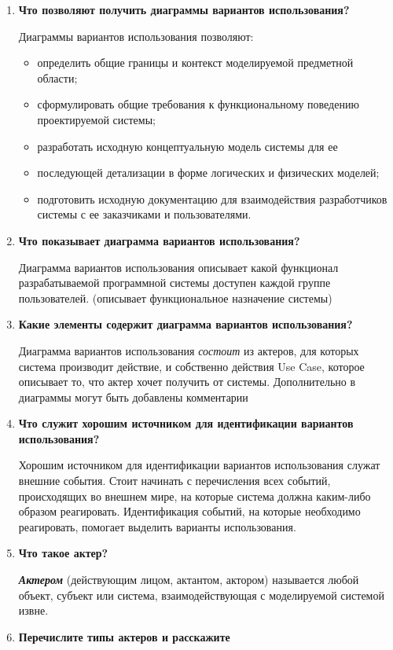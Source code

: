 \begin{enumerate}
	\item \textbf{Что позволяют получить диаграммы
		вариантов использования?}\par
		Диаграммы вариантов использования позволяют:
		\begin{itemize}
			\item определить общие границы и контекст моделируемой
				предметной области;
			\item сформулировать общие требования к функциональному поведению
				проектируемой системы;
			\item разработать исходную концептуальную модель системы для ее
			\item последующей детализации в форме логических
				и физических моделей;
			\item подготовить исходную документацию для взаимодействия
				разработчиков системы с ее заказчиками и пользователями.
		\end{itemize}
	\item \textbf{Что показывает диаграмма вариантов использования?}\par
		Диаграмма вариантов использования описывает какой функционал
		разрабатываемой программной системы доступен каждой группе
		пользователей. (описывает функциональное назначение системы)
	\item \textbf{Какие элементы содержит диаграмма
		вариантов использования?}\par
		Диаграмма вариантов использования \textit{состоит} из актеров,
		для которых система производит действие, и собственно действия
		Use Case, которое описывает то, что актер хочет получить от системы.
		Дополнительно в диаграммы могут быть добавлены комментарии
	\item \textbf{Что служит хорошим источником для идентификации
		вариантов использования?}\par
		Хорошим источником для идентификации вариантов использования
		служат внешние события. Стоит начинать с перечисления всех событий,
		происходящих во внешнем мире, на которые система должна каким-либо
		образом реагировать. Идентификация событий, на которые необходимо
		реагировать, помогает выделить варианты использования.
	\item \textbf{Что такое актер?}\par
		\textbf{\textit{Актером}} (действующим лицом, актантом, актором)
		называется любой объект, субъект или система,
		взаимодействующая с моделируемой системой извне.
	\item \textbf{Перечислите типы актеров и расскажите
}
\end{enumerate}
